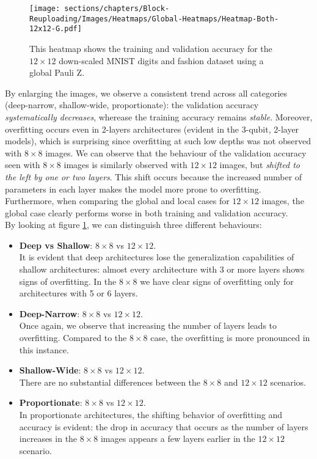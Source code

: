 \begin{figure}[h]
    \centering
    \texttt{[image: sections/chapters/Block-Reuploading/Images/Heatmaps/Global-Heatmaps/Heatmap-Both-12x12-G.pdf]}
    \caption{This heatmap shows the training and validation accuracy for the $12\times12$ 
    down-scaled MNIST digits and fashion dataset using a global Pauli Z.}
    \label{fig:heatmap-12x12-G}
\end{figure}

By enlarging the images, we observe a consistent trend across all categories 
(deep-narrow, shallow-wide, proportionate): the validation accuracy \textit{systematically decreases}, 
wherease the training accuracy remains \textit{stable}.
Moreover, overfitting occurs even in 2-layers architectures (evident in the 3-qubit, 2-layer models), 
which is surprising since overfitting at such low depths was not observed with $8\times8$ images.
We can observe that the behaviour of the validation accuracy seen with $8\times8$ images is similarly 
observed with $12\times12$ images, but \textit{shifted to the left by one or two layers}. 
This shift occurs because the increased number of parameters in each layer makes the model more prone to 
overfitting.\\
Furthermore, when comparing the global and local cases for $12\times12$ images, the global 
case clearly performs worse in both training and validation accuracy.\\
By looking at figure \ref{fig:heatmap-12x12-G}, we can distinguish 
three different behaviours:

\begin{itemize}
    \item \textbf{Deep vs Shallow}: $8\times8$ vs $12\times12$.\\
    It is evident that deep architectures lose the generalization capabilities of shallow architectures:
    almost every architecture with 3 or more layers shows signs of overfitting.
    In the $8\times8$ we have clear signs of overfitting only for architectures with 5 or 6 layers.
    \item \textbf{Deep-Narrow}: $8\times8$ vs $12\times12$.\\
    Once again, we observe that increasing the number of layers leads to overfitting. 
    Compared to the $8 \times 8$ case, the overfitting is more pronounced in this instance.
    \item \textbf{Shallow-Wide}: $8\times8$ vs $12\times12$.\\
    There are no substantial differences between the $8\times8$ and $12\times12$ scenarios.
    \item \textbf{Proportionate}: $8\times8$ vs $12\times12$.\\
    In proportionate architectures, the shifting behavior of overfitting and accuracy 
    is evident: the drop in accuracy that occurs as the number of layers increases in the $8 \times 8$ 
    images appears a few layers earlier in the $12 \times 12$ scenario.
 \end{itemize}